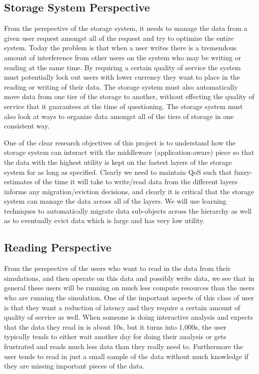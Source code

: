 \subsection{Storage System Perspective}
\label{subsec:storage-perspective}
From the perspective of the storage system, it needs to manage the data from
a given user request amongst all of the request and try to optimize the
entire system. Today the problem is that when a user writes there is a
tremendous amount of interference from other users on the system who may be
writing or reading at the same time. By requiring a certain quality
of service the system must potentially lock out users with lower currency
they want to place in the reading or writing of their data. The storage
system must also automatically move data from one tier of the storage to
another, without effecting the quality of service that it guarantees at the
time of questioning. The storage system must also look at ways to organize
data amongst all of the tiers of storage in one consistent way.

One of the clear research objectives of this project is to understand how the
storage system can interact with the middleware (application-aware) piece so
that the data with the highest utility is kept on the fastest layers of the
storage system for as long as specified. Clearly we need to maintain 
QoS such that fuzzy-estimates of the time it will take to write/read data from
the different layers informs any migration/eviction decisions, and clearly it
is critical that the storage system can manage the data across all of the
layers. We will use learning techniques to automatically migrate data
sub-objects across the hierarchy as well as to eventually evict data which is
large and has very low utility.


\subsection{Reading  Perspective}
\label{subsec:reading-perspective}
From the perspective of the users who want to read in the data from their
simulations, and then operate on this data and possibly write data, we see
that in general these users will be running on much less compute resources
than the users who are running the simulation. One of the important aspects
of this class of user is that they want a reduction of latency and they
require a certain amount of quality of service as well. When someone is
doing interactive analysis and expects that the data they read in is about
10s, but it turns into 1,000s, the user typically tends to either wait
another day for doing their analysis or gets frustrated and reads much less
data than they really need to. Furthermore the user tends to read in just a
small sample of the data without much knowledge if they are missing
important pieces of the data.


